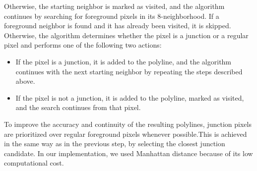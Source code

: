 Otherwise, the starting neighbor is marked as visited, and the algorithm continues by searching for foreground pixels in its 8-neighborhood. If a foreground neighbor is found and it has already been visited, it is skipped. Otherwise, the algorithm determines whether the pixel is a junction or a regular pixel and performs one of the following two actions:

\begin{itemize}
	\item If the pixel is a junction, it is added to the polyline, and the algorithm continues with the next starting neighbor by repeating the steps described above.
	\item If the pixel is not a junction, it is added to the polyline, marked as visited, and the search continues from that pixel.
\end{itemize}

To improve the accuracy and continuity of the resulting polylines, junction pixels are prioritized over regular foreground pixels whenever possible.This is achieved in the same way as in the previous step, by selecting the closest junction candidate. In our implementation, we used Manhattan distance because of its low computational cost.

